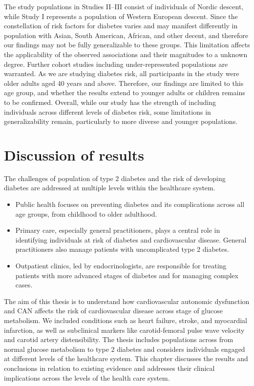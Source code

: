 \documentclass[
  a4paper,
  headsepline=true,
  open=any]{scrbook}
\begin{document}
The study populations in Studies II--III consist of individuals of
Nordic descent, while Study I represents a population of Western
European descent. Since the constellation of risk factors for diabetes
varies and may manifest differently in population with Asian, South
American, African, and other decent, and therefore our findings may not
be fully generalizable to these groups. This limitation affects the
applicability of the observed associations and their magnitudes to a
unknown degree. Further cohort studies including under-represented
populations are warranted. As we are studying diabetes risk, all
participants in the study were older adults aged 40 years and above.
Therefore, our findings are limited to this age group, and whether the
results extend to younger adults or children remains to be confirmed.
Overall, while our study has the strength of including individuals
across different levels of diabetes risk, some limitations in
generalizability remain, particularly to more diverse and younger
populations.

\hypertarget{discussion-of-results}{%
\section{Discussion of results}\label{discussion-of-results}}

The challenges of population of type 2 diabetes and the risk of
developing diabetes are addressed at multiple levels within the
healthcare system.

\begin{itemize}
\item
  Public health focuses on preventing diabetes and its complications
  across all age groups, from childhood to older adulthood.
\item
  Primary care, especially general practitioners, plays a central role
  in identifying individuals at risk of diabetes and cardiovascular
  disease. General practitioners also manage patients with uncomplicated
  type 2 diabetes.
\item
  Outpatient clinics, led by endocrinologists, are responsible for
  treating patients with more advanced stages of diabetes and for
  managing complex cases.
\end{itemize}

The aim of this thesis is to understand how cardiovascular autonomic
dysfunction and CAN affects the risk of cardiovascular disease across
stage of glucose metabolism. We included conditions such as heart
failure, stroke, and myocardial infarction, as well as subclinical
markers like carotid-femoral pulse wave velocity and carotid artery
distensibility. The thesis includes populations across from normal
glucose metabolism to type 2 diabetes and considers individuals engaged
at different levels of the healthcare system. This chapter discusses the
results and conclusions in relation to existing evidence and addresses
their clinical implications across the levels of the health care system.
\end{document}
